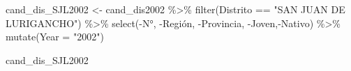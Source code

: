 \documentclass[
]{book}
\newenvironment{Shaded}{\begin{snugshade}}{\end{snugshade}}
\newcommand{\AttributeTok}[1]{\textcolor[rgb]{0.77,0.63,0.00}{#1}}
\newcommand{\FunctionTok}[1]{\textcolor[rgb]{0.00,0.00,0.00}{#1}}
\newcommand{\NormalTok}[1]{#1}
\newcommand{\OtherTok}[1]{\textcolor[rgb]{0.56,0.35,0.01}{#1}}
\newcommand{\SpecialCharTok}[1]{\textcolor[rgb]{0.00,0.00,0.00}{#1}}
\newcommand{\StringTok}[1]{\textcolor[rgb]{0.31,0.60,0.02}{#1}}
\begin{document}
\begin{Shaded}
\begin{Highlighting}[]
\NormalTok{cand\_dis\_SJL2002 }\OtherTok{\textless{}{-}}\NormalTok{ cand\_dis2002 }\SpecialCharTok{\%\textgreater{}\%}
  \FunctionTok{filter}\NormalTok{(Distrito }\SpecialCharTok{==} \StringTok{"SAN JUAN DE LURIGANCHO"}\NormalTok{) }\SpecialCharTok{\%\textgreater{}\%}
  \FunctionTok{select}\NormalTok{(}\SpecialCharTok{{-}}\StringTok{\textasciigrave{}}\AttributeTok{N°}\StringTok{\textasciigrave{}}\NormalTok{, }\SpecialCharTok{{-}}\StringTok{\textasciigrave{}}\AttributeTok{Región}\StringTok{\textasciigrave{}}\NormalTok{, }\SpecialCharTok{{-}}\StringTok{\textasciigrave{}}\AttributeTok{Provincia}\StringTok{\textasciigrave{}}\NormalTok{, }\SpecialCharTok{{-}}\StringTok{\textasciigrave{}}\AttributeTok{Joven}\StringTok{\textasciigrave{}}\NormalTok{,}\SpecialCharTok{{-}}\StringTok{\textasciigrave{}}\AttributeTok{Nativo}\StringTok{\textasciigrave{}}\NormalTok{) }\SpecialCharTok{\%\textgreater{}\%} 
  \FunctionTok{mutate}\NormalTok{(}\AttributeTok{Year =} \StringTok{"2002"}\NormalTok{)}
\end{Highlighting}
\end{Shaded}

\begin{Shaded}
\begin{Highlighting}[]
\NormalTok{cand\_dis\_SJL2002}
\end{Highlighting}
\end{Shaded}
\end{document}
